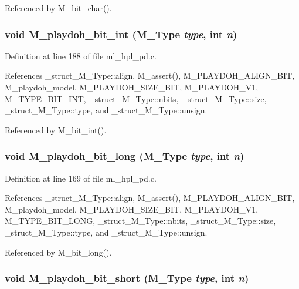 Referenced by M\_\-bit\_\-char().
\subsubsection{\setlength{\rightskip}{0pt plus 5cm}void M\_\-playdoh\_\-bit\_\-int (\bf{M\_\-Type} {\em type}, int {\em n})}\label{ml__hpl__pd_8c_d507aa40f886ada5767c8793963f829b}




Definition at line 188 of file ml\_\-hpl\_\-pd.c.

References \_\-struct\_\-M\_\-Type::align, M\_\-assert(), M\_\-PLAYDOH\_\-ALIGN\_\-BIT, M\_\-playdoh\_\-model, M\_\-PLAYDOH\_\-SIZE\_\-BIT, M\_\-PLAYDOH\_\-V1, M\_\-TYPE\_\-BIT\_\-INT, \_\-struct\_\-M\_\-Type::nbits, \_\-struct\_\-M\_\-Type::size, \_\-struct\_\-M\_\-Type::type, and \_\-struct\_\-M\_\-Type::unsign.

Referenced by M\_\-bit\_\-int().
\subsubsection{\setlength{\rightskip}{0pt plus 5cm}void M\_\-playdoh\_\-bit\_\-long (\bf{M\_\-Type} {\em type}, int {\em n})}\label{ml__hpl__pd_8c_cfa1f7add421804732bdcaf1b7bd6d15}




Definition at line 169 of file ml\_\-hpl\_\-pd.c.

References \_\-struct\_\-M\_\-Type::align, M\_\-assert(), M\_\-PLAYDOH\_\-ALIGN\_\-BIT, M\_\-playdoh\_\-model, M\_\-PLAYDOH\_\-SIZE\_\-BIT, M\_\-PLAYDOH\_\-V1, M\_\-TYPE\_\-BIT\_\-LONG, \_\-struct\_\-M\_\-Type::nbits, \_\-struct\_\-M\_\-Type::size, \_\-struct\_\-M\_\-Type::type, and \_\-struct\_\-M\_\-Type::unsign.

Referenced by M\_\-bit\_\-long().
\subsubsection{\setlength{\rightskip}{0pt plus 5cm}void M\_\-playdoh\_\-bit\_\-short (\bf{M\_\-Type} {\em type}, int {\em n})}\label{ml__hpl__pd_8c_02acab129ae6b9bbf1e7348fdd128c2a}





